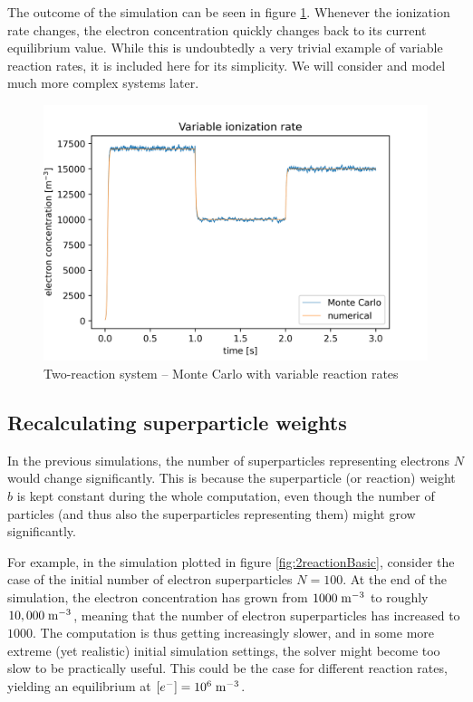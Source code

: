 The outcome of the simulation can be seen in figure \ref{fig:ENramp}. Whenever the ionization rate changes, the electron concentration quickly changes back to its current equilibrium value. While this is undoubtedly a very trivial example of variable reaction rates, it is included here for its simplicity. We will consider and model much more complex systems later.

\begin{figure} 
    \centering
    \includegraphics[width=\textwidth]{grafy/ENramp.png}
    \caption{Two-reaction system -- Monte Carlo with variable reaction rates}
    \label{fig:ENramp}
\end{figure}

\subsection{Recalculating superparticle weights}

In the previous simulations, the number of superparticles representing electrons $N$ would change significantly. This is because the superparticle (or reaction) weight $b$ is kept constant during the whole computation, even though the number of particles (and thus also the superparticles representing them) might grow significantly.

For example, in the simulation plotted in figure \ref{fig:2reactionBasic}, consider the case of the initial number of electron superparticles $N = 100$. At the end of the simulation, the electron concentration has grown from $1000\;\rm m^{-3}$ to roughly $10,000\;\rm m^{-3}$, meaning that the number of electron superparticles has increased to $1000$. The computation is thus getting increasingly slower, and in some more extreme (yet realistic) initial simulation settings, the solver might become too slow to be practically useful. This could be the case for different reaction rates, yielding an equilibrium at  $\left[e^{-}\right] = 10^6\;\rm m^{-3}$.

